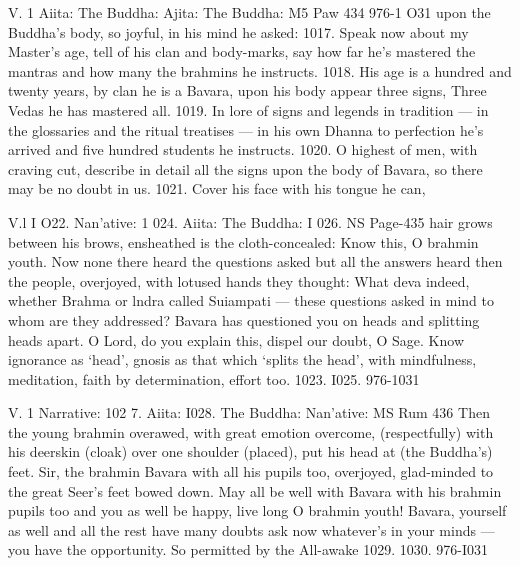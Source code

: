    
   
   V. 1
   Aiita:
   The Buddha:
   Ajita:
   The Buddha:
   M5 Paw 434
   976-1 O31
   upon the Buddha's body, so
   joyful, in his mind he asked: 1017.
   Speak now about my Master's age,
   tell of his clan and body-marks,
   say how far he's mastered the mantras
   and how many the brahmins he instructs. 1018.
   His age is a hundred and twenty years,
   by clan he is a Bavara,
   upon his body appear three signs,
   Three Vedas he has mastered all. 1019.
   In lore of signs and legends in tradition —
   in the glossaries and the ritual treatises —
   in his own Dhanna to perfection he's arrived
   and ﬁve hundred students he instructs. 1020.
   O highest of men, with craving cut,
   describe in detail all the signs
   upon the body of Bavara,
   so there may be no doubt in us. 1021.
   Cover his face with his tongue he can,
   
   
   
   V.l
   I O22.
   Nan'ative:
   1 024.
   Aiita:
   The Buddha:
   I 026.
   NS Page-435
   hair grows between his brows,
   ensheathed is the cloth-concealed:
   Know this, O brahmin youth.
   Now none there heard the questions asked
   but all the answers heard
   then the people, overjoyed,
   with lotused hands they thought:
   What deva indeed, whether Brahma
   or lndra called Suiampati —
   these questions asked in mind
   to whom are they addressed?
   Bavara has questioned you
   on heads and splitting heads apart.
   O Lord, do you explain this,
   dispel our doubt, O Sage.
   Know ignorance as `head',
   gnosis as that which `splits the head',
   with mindfulness, meditation, faith
   by determination, effort too.
   1023.
   I025.
   976-1031
   
   
   
   V. 1
   Narrative:
   102 7.
   Aiita:
   I028.
   The Buddha:
   Nan'ative:
   MS Rum 436
   Then the young brahmin overawed,
   with great emotion overcome,
   (respectfully) with his deerskin (cloak)
   over one shoulder (placed),
   put his head at (the Buddha's) feet.
   Sir, the brahmin Bavara
   with all his pupils too,
   overjoyed, glad-minded
   to the great Seer's feet bowed down.
   May all be well with Bavara
   with his brahmin pupils too
   and you as well be happy,
   live long O brahmin youth!
   Bavara, yourself as well
   and all the rest have many doubts
   ask now whatever's in your minds —
   you have the opportunity.
   So permitted by the All-awake
   1029.
   1030.
   976-I031
   
   
   
